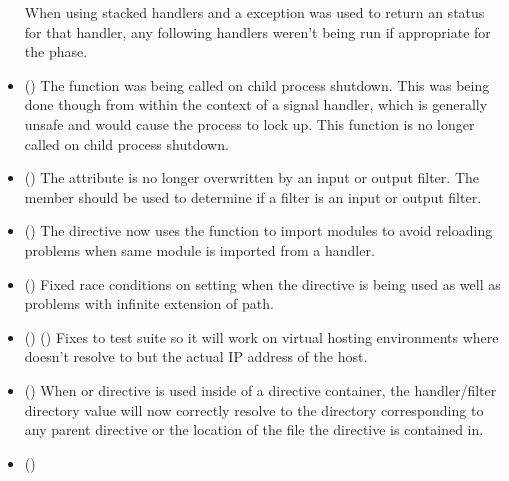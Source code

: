 \begin{itemize}
      When using stacked handlers and a  exception was
      used to return an  status for that handler, any following
      handlers weren't being run if appropriate for the phase.
    \item
      ()
      The  function was being called on child process
      shutdown. This was being done though from within the context of a
      signal handler, which is generally unsafe and would cause the process
      to lock up. This function is no longer called on child process shutdown.
    \item
      ()
      The  attribute is no longer overwritten by an input
      or output filter. The  member should be used
      to determine if a filter is an input or output filter.
    \item
      ()
      The  directive now uses the
       function to import modules to avoid
      reloading problems when same module is imported from a handler.
    \item
      ()
      Fixed race conditions on setting  when the
       directive is being used as well as problems with
      infinite extension of path.
    \item
      ()
      ()
      Fixes to test suite so it will work on virtual hosting environments
      where  doesn't resolve to  but the
      actual IP address of the host.
    \item
      ()
      When  or  directive is used
      inside of a  directive container, the handler/filter
      directory value will now correctly resolve to the directory corresponding
      to any parent  directive or the location of the
       file the  directive is contained in.
    \item
      ()

\end{itemize}
